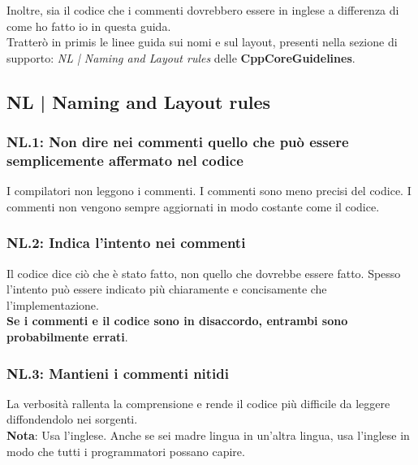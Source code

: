 \textsf{\small Inoltre, sia il codice che i commenti dovrebbero essere in inglese a differenza di come ho fatto io in questa guida.} \\

\textsf{\small Tratterò in primis le linee guida sui nomi e sul layout, presenti nella sezione di supporto: \emph{NL | Naming and Layout rules} delle \textbf{CppCoreGuidelines}.} \break


\subsection{NL | Naming and Layout rules}

\subsubsection{NL.1: Non dire nei commenti quello che può essere semplicemente affermato nel codice}

\textsf{\small I compilatori non leggono i commenti. I commenti sono meno precisi del codice. I commenti non vengono sempre aggiornati in modo costante come il codice.} \\

\subsubsection{NL.2: Indica l'intento nei commenti}

\textsf{\small Il codice dice ciò che è stato fatto, non quello che dovrebbe essere fatto. Spesso l'intento può essere indicato più chiaramente e concisamente che l'implementazione. } \\

\textsf{\small \textbf{Se i commenti e il codice sono in disaccordo, entrambi sono probabilmente errati}.} \\

\subsubsection{NL.3: Mantieni i commenti nitidi}

\textsf{\small La verbosità rallenta la comprensione e rende il codice più difficile da leggere diffondendolo nei sorgenti.} \\

\textsf{\small \textbf{Nota}: Usa l'inglese. Anche se sei madre lingua in un'altra lingua, usa l'inglese in modo che tutti i programmatori possano capire.} \\

